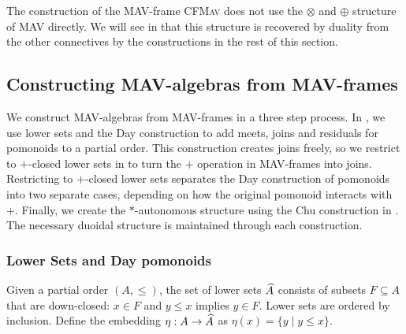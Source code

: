 
\begin{remark}
  The construction of the MAV-frame \textsc{CFMav} does not use the
  $\otimes$ and $\oplus$ structure of MAV directly. We will see in
   that this structure is
  recovered by duality from the other connectives by the constructions
  in the rest of this section.
\end{remark}

\subsection{Constructing MAV-algebras from MAV-frames}

We construct MAV-algebras from MAV-frames in a three step process. In
, we use lower sets and the Day
construction to add meets, joins and residuals for pomonoids to a
partial order. This construction creates joins freely, so we restrict
to $+$-closed lower sets in  to
turn the $+$ operation in MAV-frames into joins. Restricting to
$+$-closed lower sets separates the Day construction of pomonoids into
two separate cases, depending on how the original pomonoid interacts
with $+$. Finally, we create the $*$-autonomous structure using the
Chu construction in . The necessary duoidal
structure is maintained through each construction.

\subsubsection{Lower Sets and Day pomonoids}
\label{sec:lower-sets}

\begin{definition}
  Given a partial order $(A, \leq)$, the set of lower sets
  $\widehat{A}$ consists of subsets $F \subseteq A$ that are
  down-closed: $x \in F$ and $y \leq x$ implies $y \in F$. Lower sets
  are ordered by inclusion. Define the embedding
  $\eta : A \to \widehat{A}$ as $\eta(x) = \{ y \mid y \leq x \}$.
\end{definition}


